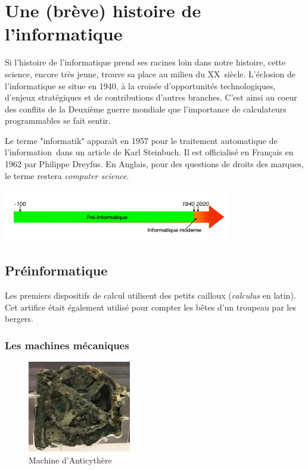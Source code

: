 \documentclass[a4paper,11pt]{book}
\begin{document}
\chapter*{Une (brève) histoire de l'informatique}

Si l'histoire de l'informatique prend ses racines loin dans notre histoire, cette science, encore très jeune, trouve sa place au milieu du \textsc{XX}\ieme ~siècle. L'éclosion de l'informatique se situe en 1940, à la croisée d'opportunités technologiques, d'enjeux stratégiques et de contributions d'autres branches. C'est ainsi au coeur des conflits de la Deuxième guerre mondiale que l'importance de calculateurs programmables se fait sentir.

Le terme "informatik" apparaît en 1957 pour le \guillemotleft traitement automatique de l'information\guillemotright~dans un article de Karl Steinbuch. Il est officialisé en Français en 1962 par Philippe Dreyfus. En Anglais, pour des questions de droits des marques, le terme restera \textit{computer science}.

\includegraphics[width=10cm]{media/infographies/chronos/Chronos.001.png}

\section{Préinformatique}
Les premiers dispositifs de calcul utilisent des petits cailloux (\textit{calculus} en latin). Cet artifice était également utilisé pour compter les bêtes d'un troupeau par les bergers.

\subsection{Les machines mécaniques}

\begin{figure} 
    \centering
    \includegraphics[width=0.4\textwidth]{media/machines/Anticythere.jpeg}
    \caption{Machine d'Anticythère}
\end{figure}
\end{document}
